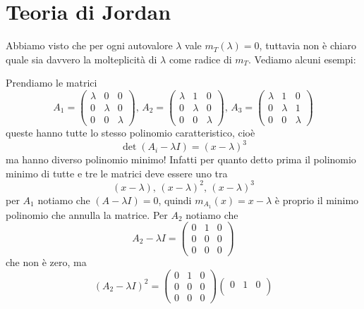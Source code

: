 \documentclass[11pt]{scrartcl}
\begin{document}
   	 \newpage
   	 
   	 
   	 \section{Teoria di Jordan}
   	 
   	 Abbiamo visto che per ogni autovalore $\lambda$ vale $m_T(\lambda)=0$, tuttavia non è chiaro quale sia davvero la molteplicità di $\lambda$ come radice di $m_T$. Vediamo alcuni esempi:
   	 \begin{example}
   	 	Prendiamo le matrici
   	 	$$
   	 	A_1=\begin{pmatrix}
   	 		\lambda & 0 & 0 \\
   	 		0 & \lambda & 0 \\
   	 		0 & 0 & \lambda
   	 	\end{pmatrix},\,
   	 	A_2=\begin{pmatrix}
   	 		\lambda & 1 & 0 \\
   	 		0 & \lambda & 0 \\
   	 		0 & 0 & \lambda
   	 	\end{pmatrix},\,
   	 	A_3=\begin{pmatrix}
   	 		\lambda & 1 & 0 \\
   	 		0 & \lambda & 1 \\
   	 		0 & 0 & \lambda
   	 	\end{pmatrix}
   	 	$$
   	 	queste hanno tutte lo stesso polinomio caratteristico, cioè
   	 	$$\det(A_i-\lambda I)=(x-\lambda)^3$$
   	 	ma hanno diverso polinomio minimo! Infatti per quanto detto prima il polinomio minimo di tutte e tre le matrici deve essere uno tra 
   	 	$$(x-\lambda),\,(x-\lambda)^2,\,(x-\lambda)^3$$
   	 	per $A_1$ notiamo che $(A-\lambda I)=0$, quindi $m_{A_1}(x)=x-\lambda$ è proprio il minimo polinomio che annulla la matrice. Per $A_2$ notiamo che
   	 	$$A_2-\lambda I =\begin{pmatrix}
   	 		0 & 1 & 0 \\
   	 		0 & 0 & 0 \\
   	 		0 & 0 & 0
   	 	\end{pmatrix}$$
   	 	che non è zero, ma 
   	 	$$(A_2-\lambda I)^2=\begin{pmatrix}
   	 		0 & 1 & 0 \\
   	 		0 & 0 & 0 \\
   	 		0 & 0 & 0
   	 	\end{pmatrix}\begin{pmatrix}
   	 	0 & 1 & 0 \\

\end{pmatrix}$$
\end{example}
\end{document}
